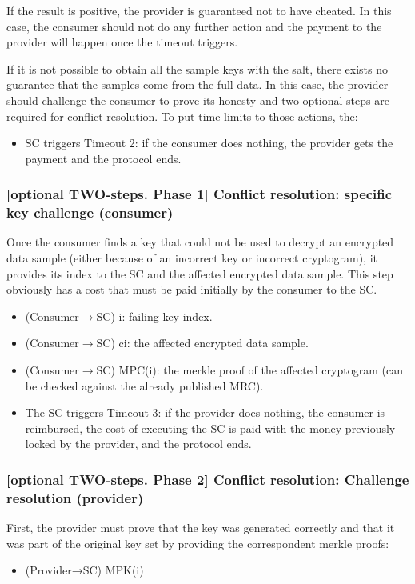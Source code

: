 \documentclass[]{article}
\begin{document}
	If the result is positive, the provider is guaranteed not to have cheated. In this case, the consumer should not do any further action and the payment to the provider will happen once the timeout triggers. 

	If it is not possible to obtain all the sample keys with the salt, there exists no guarantee that the samples come from the full data. In this case, the provider should challenge the consumer to prove its honesty and two optional steps are required for conflict resolution. To put time limits to those actions, the:
	\begin{itemize}
		\item SC triggers Timeout 2: if the consumer does nothing, the provider gets the payment and the protocol ends.
	\end{itemize}
	
	\subsubsection{[optional TWO-steps. Phase 1] Conflict resolution: specific key challenge (consumer)}
	Once the consumer finds a key that could not be used to decrypt an encrypted data sample (either because of an incorrect key or incorrect cryptogram), it provides its index to the SC and the affected encrypted data sample. This step obviously has a cost that must be paid initially by the consumer to the SC.

	\begin{itemize}
		\item (Consumer$\rightarrow$SC) i: failing key index.
		\item (Consumer$\rightarrow$SC) ci: the affected encrypted data sample.
		\item (Consumer$\rightarrow$SC) MPC(i): the merkle proof of the affected cryptogram (can be checked against the already published MRC).
		\item The SC triggers Timeout 3: if the provider does nothing, the consumer is reimbursed, the cost of executing the SC is paid with the money previously locked by the provider, and the protocol ends.
	\end{itemize}
	\subsubsection{[optional TWO-steps. Phase 2] Conflict resolution: Challenge resolution (provider)}
	First, the provider must prove that the key was generated correctly and that it was part of the original key set by providing the correspondent merkle proofs:
	\begin{itemize}
		\item(Provider→SC) MPK(i)
	\end{itemize}
\end{document}
